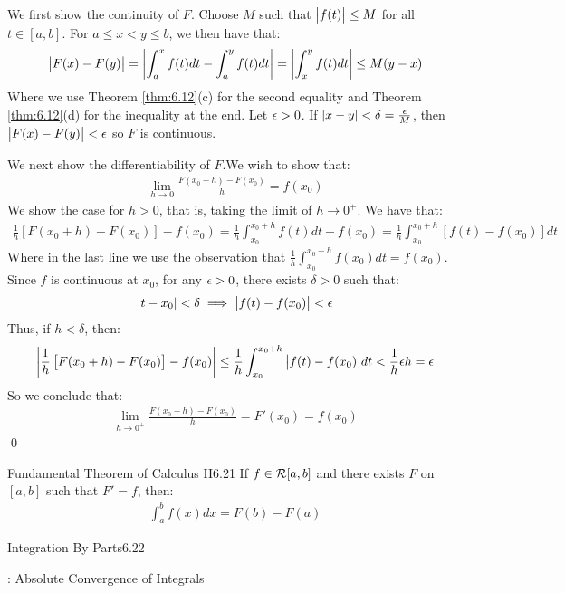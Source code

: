 \begin{nproof}
    We first show the continuity of $F$. Choose $M$ such that $\abs{f(t)} \leq M$ for all $t \in [a, b]$. For $a \leq x < y \leq b$, we then have that:
    \begin{align*}
        \abs{F(x) - F(y)} = \abs{\int_a^xf(t)dt - \int_a^yf(t)dt} = \abs{\int_x^y f(t)dt} \leq M(y - x)
    \end{align*}
    Where we use Theorem \ref{thm:6.12}(c) for the second equality and Theorem \ref{thm:6.12}(d) for the inequality at the end. Let $\epsilon > 0$. If $\abs{x - y} < \delta = \frac{\epsilon}{M}$, then $\abs{F(x) - F(y)} < \epsilon$ so $F$ is continuous.

    We next show the differentiability of $F$.We wish to show that:
    \begin{align*}
        \lim_{h \rightarrow 0} \frac{F(x_0 + h) - F(x_0)}{h} = f(x_0)
    \end{align*}
    We show the case for $h > 0$, that is, taking the limit of $h \rightarrow 0^+$. We have that:
    \begin{align*}
        \frac{1}{h}\left[F(x_0 + h) - F(x_0)\right] - f(x_0) = \frac{1}{h}\int_{x_0}^{x_0 + h}f(t)dt - f(x_0) = \frac{1}{h}\int_{x_0}^{x_0 + h}\left[f(t) - f(x_0)\right]dt
    \end{align*}
    Where in the last line we use the observation that $\frac{1}{h}\int_{x_0}^{x_0 + h}f(x_0)dt = f(x_0)$. Since $f$ is continuous at $x_0$, for any $\epsilon > 0$, there exists $\delta > 0$ such that:
    \begin{align*}
        \abs{t - x_0} < \delta \implies \abs{f(t) - f(x_0)}  <\epsilon
    \end{align*}
    Thus, if $h < \delta$, then:
    \begin{align*}
        \abs{ \frac{1}{h}\left[F(x_0 + h) - F(x_0)\right] - f(x_0)} \leq \frac{1}{h}\int_{x_0}^{x_0 + h}\abs{f(t) - f(x_0)}dt < \frac{1}{h}\epsilon h = \epsilon
    \end{align*}
    So we conclude that:
    \begin{align*}
        \lim_{h \rightarrow 0^+} \frac{F(x_0 + h) - F(x_0)}{h} = F'(x_0) = f(x_0)
    \end{align*}
    \qed
\end{nproof}

\begin{theorem}{Fundamental Theorem of Calculus II}{6.21}
    If $f \in \mathcal{R}[a, b]$ and there exists $F$ on $[a, b]$ such that $F' = f$, then:
    \begin{align*}
        \int_a^b f(x)dx = F(b) - F(a)
    \end{align*}
\end{theorem}

\begin{nproof}
    
\end{nproof}

\begin{theorem}{Integration By Parts}{6.22}
    
\end{theorem}

\begin{ndef}{: Absolute Convergence of Integrals}{}
    
\end{ndef}

